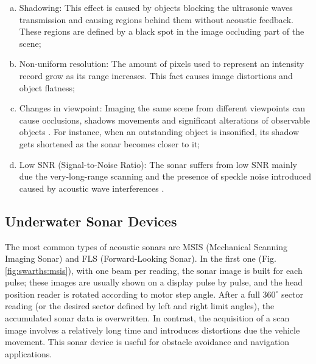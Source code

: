 \documentclass[final,5p,times]{elsarticle}
\begin{document}
\begin{enumerate}[(a)]
    \item Shadowing: This effect is caused by objects blocking the ultrasonic waves transmission and causing regions behind them without acoustic feedback. These regions are defined by a black spot in the image occluding part of the scene;
    \item Non-uniform resolution: The amount of pixels used to represent an intensity record grow as its range increases. This fact causes image distortions and object flatness;
    \item Changes in viewpoint: Imaging the same scene from different viewpoints can cause occlusions, shadows movements and significant alterations of observable objects \cite{hurtos2014b}. For instance, when an outstanding object is insonified, its shadow gets shortened as the sonar becomes closer to it;
    \item Low SNR (Signal-to-Noise Ratio): The sonar suffers from low SNR mainly due the very-long-range scanning and the presence of speckle noise introduced caused by acoustic wave interferences \cite{abbott1973}.
\end{enumerate}


\subsection{Underwater Sonar Devices}
\label{sonar:devices}

The most common types of acoustic sonars are MSIS (Mechanical Scanning Imaging Sonar) and FLS (Forward-Looking Sonar). In the first one (Fig. \ref{fig:swarths:msis}), with one beam per reading, the sonar image is built for each pulse; these images are usually shown on a display pulse by pulse, and the head position reader is rotated according to motor step angle. After a full $360^{\circ}$ sector reading (or the desired sector defined by left and right limit angles), the accumulated sonar data is overwritten. In contrast, the acquisition of a scan image involves a relatively long time and introduces distortions due the vehicle movement. This sonar device is useful for obstacle avoidance \cite{ganesan2015} and navigation \cite{ribas2010} applications.
\end{document}
